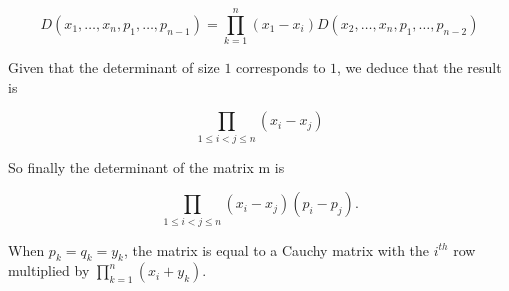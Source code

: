 \documentclass[a4paper,12pt]{article}
\begin{document}
\[ D(x_1, \ldots, x_n, p_1, \ldots, p_{n-1}) =
\prod_{k=1}^n(x_1-x_i) D(x_2, \ldots, x_n, p_1, \ldots, p_{n-2})\]

Given that the determinant of size $1$ corresponds to $1$, we deduce
that the result is

\[ \prod_{1\le i<j\le n}(x_i - x_j)\]

So finally the determinant of the matrix m is

\[ \prod_{1\le i<j\le n}(x_i - x_j)(p_i - p_j).\]

When $p_k = q_k = y_k$, the matrix is equal to a Cauchy matrix with
the $i^{th}$ row multiplied by $\prod_{k=1}^n(x_i + y_k).$
\end{document}
